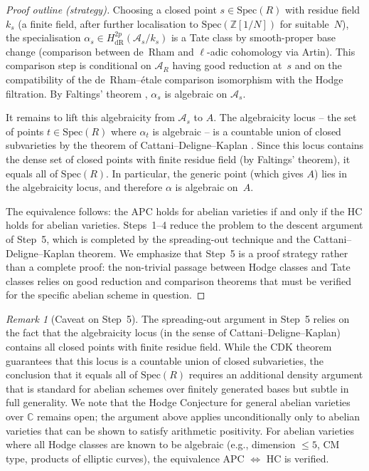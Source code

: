 \documentclass[aps,prd,twocolumn,superscriptaddress,nofootinbib]{revtex4-2}
\theoremstyle{definition}
\theoremstyle{remark}
\newtheorem{remark}[theorem]{Remark}
\begin{document}
\begin{proof}[Proof outline (strategy)]
Choosing a closed point $s \in \mathrm{Spec}(R)$ with residue field $k_s$ (a finite field, after further localisation to $\mathrm{Spec}(\mathbb{Z}[1/N])$ for suitable~$N$), the specialisation $\alpha_s \in H^{2p}_{\mathrm{dR}}(\mathcal{A}_s/k_s)$ is a Tate class by smooth-proper base change (comparison between de~Rham and $\ell$-adic cohomology via Artin). This comparison step is conditional on $\mathcal{A}_R$ having good reduction at~$s$ and on the compatibility of the de~Rham--\'etale comparison isomorphism with the Hodge filtration. By Faltings' theorem \cite{Faltings1983}, $\alpha_s$ is algebraic on $\mathcal{A}_s$.

It remains to lift this algebraicity from $\mathcal{A}_s$ to $A$. The algebraicity locus -- the set of points $t \in \mathrm{Spec}(R)$ where $\alpha_t$ is algebraic -- is a countable union of closed subvarieties by the theorem of Cattani--Deligne--Kaplan \cite{CattaniDeligneKaplan1995}. Since this locus contains the dense set of closed points with finite residue field (by Faltings' theorem), it equals all of $\mathrm{Spec}(R)$. In particular, the generic point (which gives $A$) lies in the algebraicity locus, and therefore $\alpha$ is algebraic on~$A$.

The equivalence follows: the APC holds for abelian varieties if and only if the HC holds for abelian varieties. Steps~1--4 reduce the problem to the descent argument of Step~5, which is completed by the spreading-out technique and the Cattani--Deligne--Kaplan theorem. We emphasize that Step~5 is a proof strategy rather than a complete proof: the non-trivial passage between Hodge classes and Tate classes relies on good reduction and comparison theorems that must be verified for the specific abelian scheme in question.
\end{proof}

\begin{remark}[Caveat on Step~5]
The spreading-out argument in Step~5 relies on the fact that the algebraicity locus (in the sense of Cattani--Deligne--Kaplan) contains all closed points with finite residue field. While the CDK theorem guarantees that this locus is a countable union of closed subvarieties, the conclusion that it equals all of $\mathrm{Spec}(R)$ requires an additional density argument that is standard for abelian schemes over finitely generated bases but subtle in full generality. We note that the Hodge Conjecture for general abelian varieties over $\mathbb{C}$ remains open; the argument above applies unconditionally only to abelian varieties that can be shown to satisfy arithmetic positivity. For abelian varieties where all Hodge classes are known to be algebraic (e.g., dimension $\leq 5$, CM type, products of elliptic curves), the equivalence APC $\Leftrightarrow$ HC is verified.
\end{remark}
\end{document}
